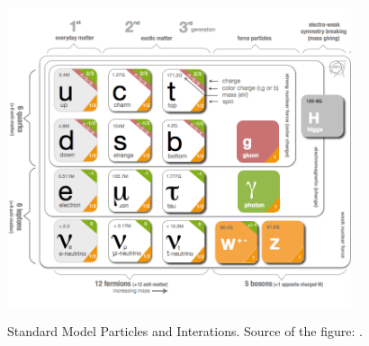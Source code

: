 \begin{figure}[htb]
  \begin{center}
    {\includegraphics[width=0.90\textwidth]{../figs/Intro/StandardModel.png}}
    \caption{Standard Model Particles and Interations. Source of the figure: \cite{ref_fig_SM}.}
    \label{fig:SMtable}
  \end{center}
\end{figure}





